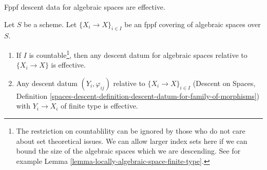 \begin{lemma}
\label{lemma-descend-algebraic-space}
\begin{slogan}
Fppf descent data for algebraic spaces are effective.
\end{slogan}
Let $S$ be a scheme. Let $\{X_i \to X\}_{i \in I}$ be an fppf
covering of algebraic spaces over $S$.
\begin{enumerate}
\item If $I$ is countable\footnote{The restriction on countablility can be
ignored by those who do not care about set theoretical issues. We can allow
larger index sets here if we can bound the size of the algebraic spaces
which we are descending. See for example
Lemma \ref{lemma-locally-algebraic-space-finite-type}.}, then any
descent datum for algebraic spaces relative to $\{X_i \to X\}$ is effective.
\item Any descent datum $(Y_i, \varphi_{ij})$ relative to
$\{X_i \to X\}_{i \in I}$ (Descent on Spaces, Definition
\ref{spaces-descent-definition-descent-datum-for-family-of-morphisms})
with $Y_i \to X_i$ of finite type
is effective.
\end{enumerate}
\end{lemma}

